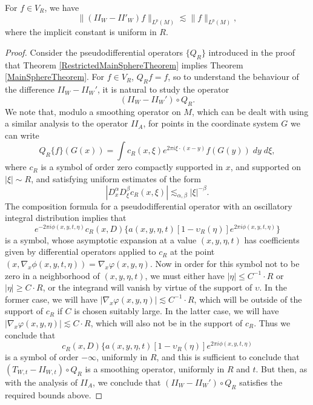 \begin{lemma}
    For $f \in V_R$, we have
    \[ \| (II_W - II'_W) f \|_{L^p(M)} \lesssim \| f \|_{L^p(M)}, \]
    where the implicit constant is uniform in $R$.
\end{lemma}
\begin{proof}
    Consider the pseudodifferential operators $\{ Q_R \}$ introduced in the proof that Theorem \ref{RestrictedMainSphereTheorem} implies Theorem \ref{MainSphereTheorem}. For $f \in V_R$, $Q_R f = f$, so to understand the behaviour of the difference $II_W - II_W'$, it is natural to study the operator
    \[ ( II_W - II_W' ) \circ Q_R. \]
    We note that, modulo a smoothing operator on $M$, which can be dealt with using a similar analysis to the operator $II_A$, for points in the coordinate system $G$ we can write
    \[ Q_R \{ f \}(G(x)) = \int c_R(x,\xi) e^{2 \pi i \xi \cdot (x - y)} f(G(y))\; dy\; d\xi, \]
    where $c_R$ is a symbol of order zero compactly supported in $x$, and supported on $|\xi| \sim R$, and satisfying uniform estimates of the form
    \[ |D^\alpha_x D^\beta_\xi c_R(x,\xi)| \lesssim_{\alpha,\beta} |\xi|^{-\beta}. \]
    The composition formula for a pseudodifferential operator with an oscillatory integral distribution implies that
    \[ e^{- 2 \pi i \phi(x,y,t,\eta)} c_R(x,D) \{ a(x,y,\eta,t) [ 1 - \upsilon_R(\eta) ] e^{2 \pi i \phi(x,y,t,\eta)}  \} \]
    is a symbol, whose asymptotic expansion at a value $(x,y,\eta,t)$ has coefficients given by differential operators applied to $c_R$ at the point $(x, \nabla_x \phi(x,y,t,\eta)) = \nabla_x \varphi(x,y,\eta)$. Now in order for this symbol not to be zero in a neighborhood of $(x,y,\eta,t)$, we must either have $|\eta| \leq C^{-1} \cdot R$ or $|\eta| \geq C \cdot R$, or the integrand will vanish by virtue of the support of $\upsilon$. In the former case, we will have $|\nabla_x \varphi(x,y,\eta)| \lesssim C^{-1} \cdot R$, which will be outside of the support of $c_R$ if $C$ is chosen suitably large. In the latter case, we will have $|\nabla_x \varphi(x,y,\eta)| \lesssim C \cdot R$, which will also not be in the support of $c_R$. Thus we conclude that
    \[ c_R(x,D) \{ a(x,y,\eta,t) [ 1 - \upsilon_R(\eta) ] e^{2 \pi i \phi(x,y,t,\eta)} \]
    is a symbol of order $-\infty$, uniformly in $R$, and this is sufficient to conclude that $(T_{W,t} - II_{W,t}) \circ Q_R$ is a smoothing operator, uniformly in $R$ and $t$. But then, as with the analysis of $II_A$, we conclude that $(II_W - II_W') \circ Q_R$ satisfies the required bounds above.
\end{proof}

